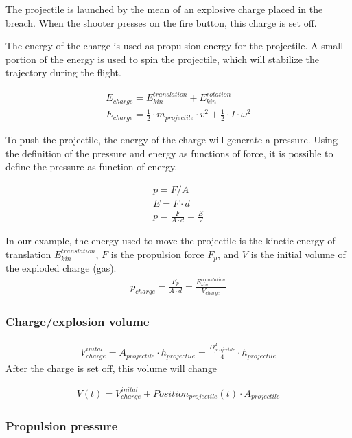 \documentclass[12pt,a4paper]{article}
\begin{document}
The projectile is launched by the mean of an explosive charge placed in the breach. 
When the shooter presses on the fire button, this charge is set off. 

The energy of the charge is used as propulsion energy for the projectile. A small portion of the energy is used to spin the projectile, which will stabilize the trajectory during the flight. 

\begin{eqnarray}
	E_{charge} = E_{kin}^{translation} + E_{kin}^{rotation} \\
	E_{charge} = \frac{1}{2} \cdot m_{projectile} \cdot v^2 + \frac{1}{2} \cdot I \cdot \omega ^ 2
\end{eqnarray}

To push the projectile, the energy of the charge will generate a pressure. Using the definition of the pressure and energy as functions of force, it is possible to define the pressure as function of energy. 

\begin{eqnarray}
	p = F/A \\
	E = F \cdot d \\
	p = \frac{F}{A \cdot d} = \frac{E}{V}
\end{eqnarray}

In our example, the energy used to move the projectile is the kinetic energy of translation $E_{kin}^{translation}$, $F$ is the propulsion force $F_p$, and $V$ is the initial volume of the exploded charge (gas).
\begin{eqnarray}
	p_{charge} = \frac{F_p}{A \cdot d} = \frac{E_{kin}^{translation}}{V_{charge}}
\end{eqnarray}

\subsubsection{Charge/explosion volume}
\begin{eqnarray}
	V_{charge}^{inital} = A_{ projectile} \cdot h_{projectile} =  \frac{D_{projectile}^2}{4} \cdot h_{projectile}
\end{eqnarray}
After the charge is set off, this volume will change

\begin{eqnarray}
	V(t) = V_{charge}^{inital} + Position_{projectile}(t) \cdot A_{projectile}
\end{eqnarray}

\subsubsection{Propulsion pressure}
\end{document}
